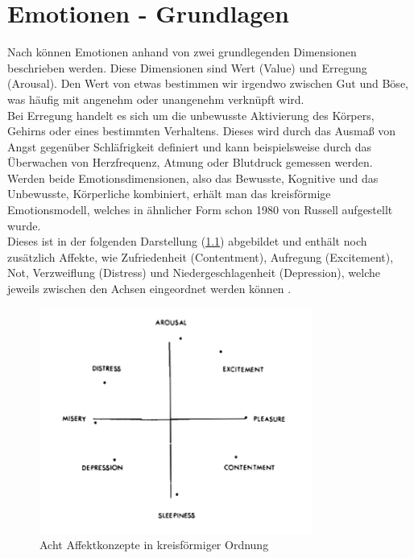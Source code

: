 \documentclass[./dokumentation.tex]{subfiles}
\begin{document}
\chapter{Emotionen - Grundlagen}
Nach  \cite{vanGorp2013} können Emotionen anhand von zwei grundlegenden Dimensionen beschrieben werden. Diese Dimensionen sind Wert (Value) und Erregung (Arousal). Den Wert von etwas bestimmen wir irgendwo zwischen Gut und Böse, was häufig mit angenehm oder unangenehm verknüpft wird. \\
Bei Erregung handelt es sich um die unbewusste Aktivierung des Körpers, Gehirns oder eines bestimmten Verhaltens. Dieses wird durch das Ausmaß von Angst gegenüber Schläfrigkeit definiert und kann beispielsweise durch das Überwachen von Herzfrequenz, Atmung oder Blutdruck gemessen werden. Werden beide Emotionsdimensionen, also das Bewusste, Kognitive und das Unbewusste, Körperliche kombiniert, erhält man das kreisförmige Emotionsmodell, welches in ähnlicher Form schon 1980 von Russell aufgestellt wurde.\\ 
Dieses ist in der folgenden Darstellung (\ref{fig4:affect}) abgebildet und enthält noch zusätzlich Affekte, wie Zufriedenheit (Contentment), Aufregung (Excitement), Not, Verzweiflung (Distress) und Niedergeschlagenheit (Depression), welche jeweils zwischen den Achsen eingeordnet werden können  \cite{Russell1980}. \\

\begin{figure}[H]
    \centering
    \includegraphics[width=0.8\textwidth]{bilder/russell1.png}
    \caption{Acht Affektkonzepte in kreisförmiger Ordnung \cite{Russell1980}}
    \label{fig4:affect}
\end{figure}\\
\end{document}
